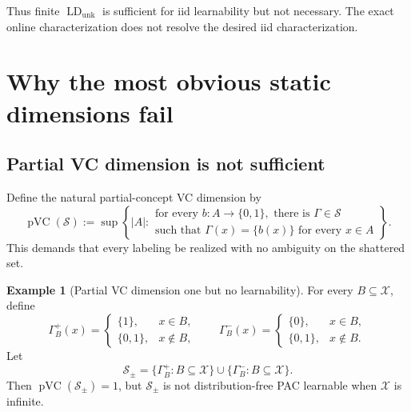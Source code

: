 \documentclass[11pt]{article}
\theoremstyle{definition}
\newtheorem{example}[theorem]{Example}
\theoremstyle{remark}
\newcommand{\X}{\mathcal X}
\newcommand{\Y}{\{0,1\}}
\newcommand{\SV}{\mathcal S}
\newcommand{\LDu}{\operatorname{LD}_{\mathrm{unk}}}
\newcommand{\pVC}{\operatorname{pVC}}
\newcommand{\1}{\mathbf 1}
\begin{document}
Thus finite $\LDu$ is sufficient for iid learnability but not necessary. The exact online characterization does not resolve the desired iid characterization.

\section{Why the most obvious static dimensions fail}

\subsection{Partial VC dimension is not sufficient}

Define the natural partial-concept VC dimension by
\[
\pVC(\SV)
:=
\sup\left\{|A|:
\begin{array}{l}
\text{for every }b:A\to\Y,\text{ there is }\Gamma\in\SV\\[-0.2em]
\text{such that }\Gamma(x)=\{b(x)\}\text{ for every }x\in A
\end{array}
\right\}.
\]
This demands that every labeling be realized with no ambiguity on the shattered set.

\begin{example}[Partial VC dimension one but no learnability]
For every $B\subseteq\X$, define
\[
    \Gamma_B^+(x)=
    \begin{cases}
        \{1\},&x\in B,\\
        \{0,1\},&x\notin B,
    \end{cases}
    \qquad
    \Gamma_B^-(x)=
    \begin{cases}
        \{0\},&x\in B,\\
        \{0,1\},&x\notin B.
    \end{cases}
\]
Let
\[
    \SV_{\pm}
    =
    \{\Gamma_B^+:B\subseteq\X\}
    \cup
    \{\Gamma_B^-:B\subseteq\X\}.
\]
Then $\pVC(\SV_{\pm})=1$, but $\SV_{\pm}$ is not distribution-free PAC learnable when $\X$ is infinite.
\end{example}
\end{document}
